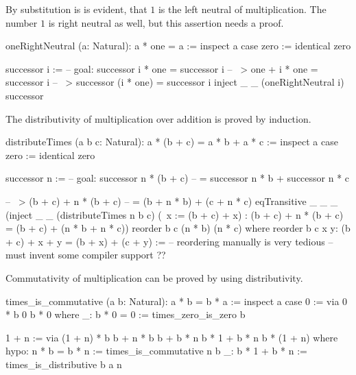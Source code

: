 By substitution is is evident, that $1$ is the left neutral of
multiplication. The number $1$ is right neutral as well, but this assertion
needs a proof.

\begin{alba}
    oneRightNeutral (a: Natural): a * one = a :=
        inspect a case
            zero :=
                identical zero

            successor i :=
                -- goal:  successor i * one = successor i
                -- ~>     one + i * one = successor i
                -- ~>     successor (i * one) = successor i
                inject _ _
                    (oneRightNeutral i)
                    successor
\end{alba}


The distributivity of multiplication over addition is proved by induction.
%
\begin{alba}
    distributeTimes (a b c: Natural): a * (b + c) = a * b + a * c :=
        inspect a case
            zero :=
                identical zero

            successor n :=
                -- goal:  successor n * (b + c)
                --        = successor n * b + successor n * c

                -- ~>     (b + c) + n * (b + c)
                --        = (b + n * b) + (c + n * c)
                eqTransitive _ _ _
                    (inject _ _
                        (distributeTimes n b c)
                        (\ x := (b + c) + x)
                        : (b + c) + n * (b + c) = (b + c) + (n * b + n * c))
                    reorder b c (n * b) (n * c)
                where
                    reorder b c x y: (b + c) + x + y = (b + x) + (c + y)
                    :=
                        -- reordering manually is very tedious
                        -- must invent some compiler support
                        ??
\end{alba}

Commutativity of multiplication can be proved by using distributivity.

\begin{alba}
  times_is_commutative (a b: Natural): a * b = b * a :=
    inspect a case
      0 :=
       via 0 * b
           0
           b * 0
       where
         _: b * 0 = 0 := times_zero_is_zero b

      1 + n :=
        via
          (1 + n) * b
          b + n * b
          b + b * n
          b * 1 + b * n
          b * (1 + n)
        where
          hypo: n * b = b * n := times_is_commutative n b
          _: b * 1 + b * n := times_is_distributive b a n
\end{alba}






